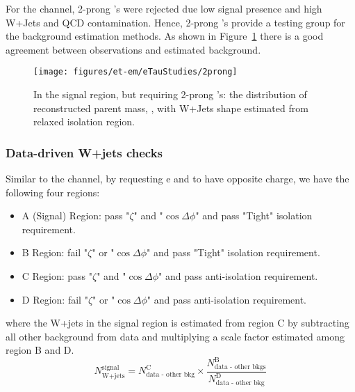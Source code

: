 For the \teth channel, 2-prong \tauh's were rejected due low signal
presence and high W+Jets and QCD contamination.  Hence, 2-prong
\tauh's provide a testing group for the background estimation
methods. As shown in Figure~\ref{fig:et_2prong} there is a good
agreement between observations and estimated background.

\begin{figure}\centering
  \texttt{[image: figures/et-em/eTauStudies/2prong]}
  \caption{\label{fig:et_2prong} In the signal region, but requiring
    2-prong \tauh's: the distribution of reconstructed parent mass,
    \meffetau, with W+Jets shape estimated from relaxed \tauh
    isolation region.}
\end{figure}

\subsubsection{Data-driven W+jets checks}
Similar to the \tmth channel, by requesting e and \tauh to have opposite charge, 
we have the following four regions:
\begin{itemize}
  \item A (Signal) Region: pass "$\zeta$" and "$\cos\Delta\phi$" and \tauh pass "Tight" isolation requirement.
  \item B Region: fail "$\zeta$" or "$\cos\Delta\phi$" and \tauh pass "Tight" isolation requirement.
  \item C Region: pass "$\zeta$" and "$\cos\Delta\phi$" and \tauh pass anti-isolation requirement.
  \item D Region: fail "$\zeta$" or "$\cos\Delta\phi$" and \tauh pass anti-isolation requirement.
\end{itemize}
where the W+jets in the signal region is estimated from region C 
by subtracting all other background from data and multiplying a 
scale factor estimated among region B and D.
\begin{equation}\label{eq:et_data_WJets}
N^{\text{signal}}_{\text{W+jets}} = N^{\text{C}}_{\text{data - other bkg}} \times \frac{N^{\text{B}}_{\text{data - other bkgs}}}{N^{\text{D}}_{\text{data - other bkg}}}
\end{equation}

